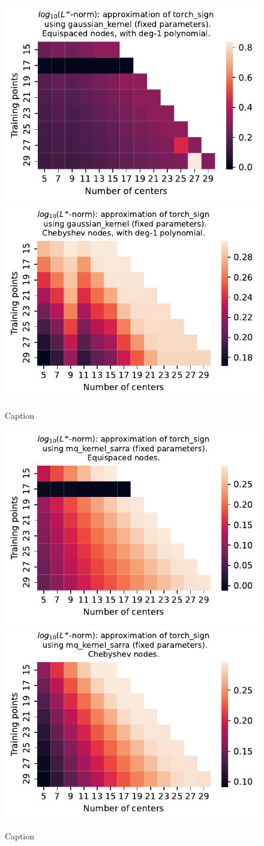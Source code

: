 \documentclass[12pt]{report} %
\begin{document}
\begin{figure}[ht]
    \centering
    
    \includegraphics[width=.49\textwidth]{imagenes/experiments/1d/least_squares/opt-torch_sign-Kgaussian_kernel-Poly-Equi.pdf}
    \includegraphics[width=.49\textwidth]{imagenes/experiments/1d/least_squares/opt-torch_sign-Kgaussian_kernel-Poly-Cheb.pdf}
    \caption{Caption}
    \label{fig:opt-torch-sign-gaussian-poly}
\end{figure}


\begin{figure}[ht]
    \centering
    
    \includegraphics[width=.49\textwidth]{imagenes/experiments/1d/least_squares/opt-torch_sign-Kmq_kernel_sarra-Equi.pdf}
    \includegraphics[width=.49\textwidth]{imagenes/experiments/1d/least_squares/opt-torch_sign-Kmq_kernel_sarra-Cheb.pdf}
    \caption{Caption}
    \label{fig:opt-torch-sign-sarra}
\end{figure}
\end{document}
